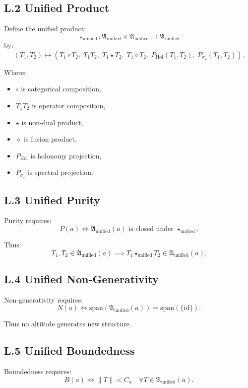 \subsection*{L.2 Unified Product}

Define the unified product:
\[
\star_{\mathrm{unified}} :
\mathfrak{A}_{\mathrm{unified}}
\times
\mathfrak{A}_{\mathrm{unified}}
\to
\mathfrak{A}_{\mathrm{unified}}
\]
by:
\[
(T_1, T_2)
\mapsto
(T_1 \circ T_2,\;
T_1 T_2,\;
T_1 \star T_2,\;
T_1 \diamond T_2,\;
P_{\mathrm{Hol}}(T_1,T_2),\;
P_{\sigma_{\star}}(T_1,T_2)).
\]

Where:
\begin{itemize}
    \item $\circ$ is categorical composition,
    \item $T_1 T_2$ is operator composition,
    \item $\star$ is non-dual product,
    \item $\diamond$ is fusion product,
    \item $P_{\mathrm{Hol}}$ is holonomy projection,
    \item $P_{\sigma_{\star}}$ is spectral projection.
\end{itemize}

\subsection*{L.3 Unified Purity}

Purity requires:
\[
P(a) \iff
\mathfrak{A}_{\mathrm{unified}}(a)
\text{ is closed under }
\star_{\mathrm{unified}}.
\]

Thus:
\[
T_1,T_2 \in \mathfrak{A}_{\mathrm{unified}}(a)
\implies
T_1 \star_{\mathrm{unified}} T_2
\in
\mathfrak{A}_{\mathrm{unified}}(a).
\]

\subsection*{L.4 Unified Non-Generativity}

Non-generativity requires:
\[
N(a) \iff
\mathrm{span}(\mathfrak{A}_{\mathrm{unified}}(a))
=
\mathrm{span}(\{\mathrm{id}\}).
\]

Thus no altitude generates new structure.

\subsection*{L.5 Unified Boundedness}

Boundedness requires:
\[
B(a) \iff
\|T\| < C_a
\quad
\forall T \in \mathfrak{A}_{\mathrm{unified}}(a).
\]


